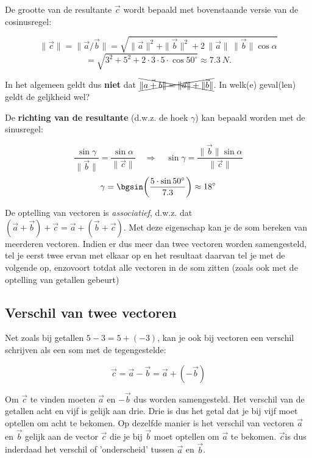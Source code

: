 \documentclass{ximera}
\begin{document}
\begin{example}
\begin{question}
De grootte van de resultante \(\vec{c}\) wordt bepaald met bovenstaande versie van de  cosinusregel: 

\[
\|\vec{c}\| = \|\vec{a} / \vec{b}\|  = \sqrt{\|\vec{a}\|^2 + \|\vec{b}\|^2 + 2 \,\|\vec{a}\|\,\|\vec{b}\|\cos\alpha}
\]
\[
= \sqrt{3^2 + 5^2 + 2 \cdot 3 \cdot 5 \cdot \cos 50^\circ} \approx \SI{7.3}{N}. 
\]


\end{question}

\end{example}

\begin{remark}
In het algemeen geldt dus \textbf{niet} dat  \( \xcancel{ \|\vec{a+b}\| = \|\vec{a}\| + \|\vec{b}\| } \). 
In welk(e) geval(len) geldt de geljkheid wel? 
\end{remark}


De \textbf{richting van de resultante} (d.w.z. de hoek \(\gamma\)) kan bepaald worden met de sinusregel: 


\[
\frac{\sin\gamma}{\|\vec{b}\|} = \frac{\sin\alpha}{\|\vec{c}\|}
\quad\Longrightarrow\quad
\sin\gamma = \frac{\|\vec{b}\|\sin\alpha}{\|\vec{c}\|}
\]
\[
\gamma = \bgsin\!\left(\frac{5\cdot\sin 50^\circ}{7.3}\right) \approx 18^\circ
\]





De optelling van vectoren is \textit{associatief}, d.w.z. dat \((\vec{a} + \vec{b}) + \vec{c} = \vec{a} + (\vec{b} + \vec{c})\). 
Met deze eigenschap kan je de som bereken van meerderen vectoren. 
Indien er dus meer dan twee vectoren worden samengesteld, tel je eerst twee ervan met elkaar op en het resultaat daarvan tel je met de volgende op, enzovoort totdat alle vectoren in de som zitten (zoals ook met de optelling van getallen gebeurt)

\subsection*{Verschil van twee vectoren}

Net zoals bij getallen $5 - 3 = 5 + (-3)$, kan je ook bij vectoren een verschil schrijven als een som met de tegengestelde: 

\[
\vec{c} = \vec{a}-\vec{b} = \vec{a} + (-\vec{b})
\]

Om \(\vec{c}\) te vinden moeten \(\vec{a}\) en \(-\vec{b}\) dus worden samengesteld.
Het verschil van de getallen acht en vijf is gelijk aan drie. 
Drie is dus het getal dat je bij vijf moet optellen om acht te bekomen. 
Op dezelfde manier is het verschil van vectoren \(\vec{a}\) en \(\vec{b}\) gelijk aan de vector \(\vec{c}\) die je bij \(\vec{b}\) moet optellen om \(\vec{a}\) te bekomen.
 \(\vec{c}\)is dus inderdaad het verschil of 'onderscheid' tussen \(\vec{a}\) en \(\vec{b}\). 
\end{document}
